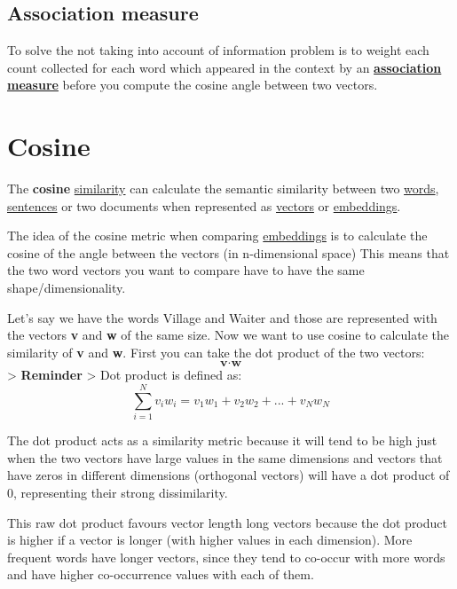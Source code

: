 \documentclass[
  11pt,
  british,
]{article}
\begin{document}
\hypertarget{association-measure}{%
\subsection{Association measure}\label{association-measure}}

To solve the not taking into account of information problem is to weight
each count collected for each word which appeared in the context by an
\textbf{\href{Association\%20measure.md}{association measure}} before
you compute the cosine angle between two vectors.

\hypertarget{cosine}{%
\section{Cosine}\label{cosine}}

The \textbf{cosine} \href{Similarity.md}{similarity} can calculate the
semantic similarity between two \href{../Data/Words.md}{words},
\href{../Data/Sentences.md}{sentences} or two documents when represented
as \href{Vector\%20semantics.md}{vectors} or
\href{Embeddings.md}{embeddings}.

The idea of the cosine metric when comparing
\href{Word\%20similarity.md}{embeddings} is to calculate the cosine of
the angle between the vectors (in n-dimensional space) This means that
the two word vectors you want to compare have to have the same
shape/dimensionality.

Let's say we have the words Village and Waiter and those are represented
with the vectors \textbf{v} and \textbf{w} of the same size. Now we want
to use cosine to calculate the similarity of \textbf{v} and \textbf{w}.
First you can take the dot product of the two vectors:
\[\textbf{v} \cdot \textbf{w}\] \textgreater{} \textbf{Reminder}
\textgreater{} Dot product is defined as:
\[\sum\limits_{i=1}^Nv_iw_i=v_1w_1+v_2w_2+...+v_Nw_N\]

The dot product acts as a similarity metric because it will tend to be
high just when the two vectors have large values in the same dimensions
and vectors that have zeros in different dimensions (orthogonal vectors)
will have a dot product of 0, representing their strong dissimilarity.

This raw dot product favours vector length long vectors because the dot
product is higher if a vector is longer (with higher values in each
dimension). More frequent words have longer vectors, since they tend to
co-occur with more words and have higher co-occurrence values with each
of them.
\end{document}
